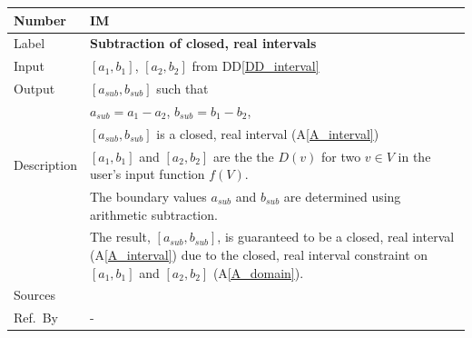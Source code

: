 \documentclass[12pt]{article}
\newcommand{\colAwidth}{0.13\textwidth}
\newcommand{\colBwidth}{0.82\textwidth}
\newcommand{\ddref}[1]{DD\ref{#1}}
\newcommand{\aref}[1]{A\ref{#1}}
\newcounter{instnum} %
\begin{document}
\noindent
\begin{minipage}{\textwidth}
	\renewcommand*{\arraystretch}{1.5}
	\begin{tabular}{| p{\colAwidth} | p{\colBwidth}|}
		\hline
		\rowcolor[gray]{0.9}
		Number& IM{instnum}\theinstnum \label{I_subtraction}\\
		\hline
		Label& \bf Subtraction of closed, real intervals\\
		\hline
		Input&$[a_{1}, b_{1}]$, $[a_{2}, b_{2}]$ from \ddref{DD_interval}\\
		\hline
		Output&$[a_{sub}, b_{sub}]$ such that\\
		&$a_{sub} = a_{1} - a_{2}$, $b_{sub} = b_{1} - b_{2}$,\\
		&$[a_{sub}, b_{sub}]$ is a closed, real interval (\aref{A_interval}) \\
		\hline
		Description&$[a_{1}, b_{1}]$ and $[a_{2}, b_{2}]$ are the the $D(v)$ 
		for two $v \in V$ in the user's input function $f(V)$. \\
		&The boundary values $a_{sub}$ and  $b_{sub}$ are determined using 
		arithmetic subtraction.\\
		& The result, $[a_{sub}, b_{sub}]$, is guaranteed to be a closed, real 
		interval (\aref{A_interval}) due to the closed, real interval 
		constraint on $[a_{1}, b_{1}]$ and $[a_{2}, b_{2}]$ (\aref{A_domain}).
		\\
		\hline
		Sources& ~\cite{intervalarithmetic} \ \\
		\hline
		Ref.\ By & -\\
		\hline
	\end{tabular}
\end{minipage}\\

~\newline
\end{document}
